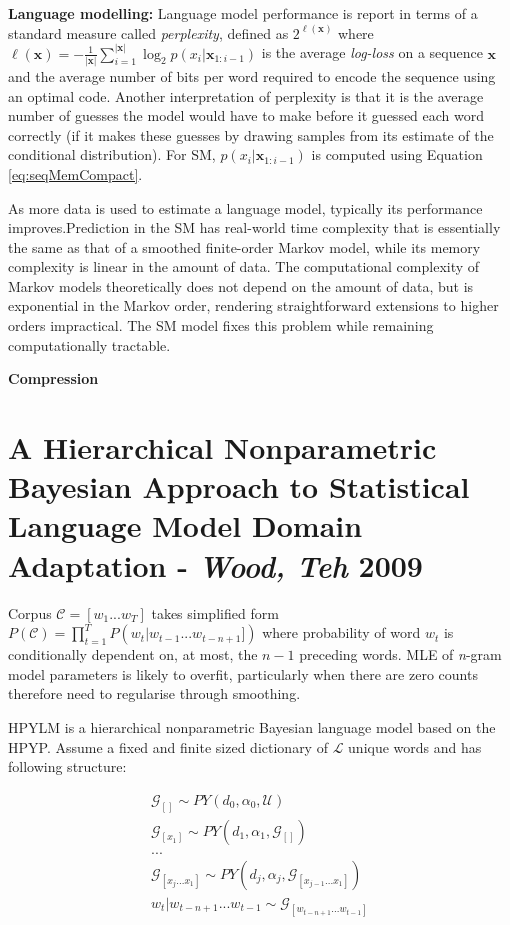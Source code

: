 \textbf{Language modelling:} Language model performance is report in terms of a standard measure called \textit{perplexity}, defined as $2^{\ell(\boldsymbol x)}$ where $\ell(\boldsymbol x)=-\frac{1}{|\boldsymbol x|}\sum_{i=1}^{|\boldsymbol x|}\log_{2}p(x_{i}|\boldsymbol x_{1:i-1})$ is the average \textit{log-loss} on a sequence $\boldsymbol x$ and the average number of bits per word required to encode the sequence using an optimal code. Another interpretation of perplexity is that it is the average number of guesses the model would have to make before it guessed each word correctly (if it makes these guesses by drawing samples from its estimate of the conditional distribution). For SM, $p(x_{i}|\boldsymbol x_{1:i-1})$ is computed using Equation \ref{eq:seqMemCompact}.

As more data is used to estimate a language model, typically its performance improves.Prediction in the SM has real-world time complexity that is essentially the same as that of a smoothed finite-order Markov model, while its memory complexity is linear in the amount of data. The computational complexity of Markov models theoretically does not depend on the amount of data, but is exponential in the Markov order, rendering straightforward extensions to higher orders impractical. The SM model fixes this problem while remaining computationally tractable.

\textbf{Compression}



\section{A Hierarchical Nonparametric Bayesian Approach to Statistical Language Model Domain Adaptation - \textit{Wood, Teh} 2009} \cite{wood2009hierarchical}

Corpus $\mathcal{C} =[w_{1}...w_{T}]$ takes simplified form $P(\mathcal{C})=\prod_{t=1}^{T}P(w_{t}|w_{t-1}...w_{t-n+1}])$ where probability of word $w_{t}$ is conditionally dependent on, at most, the $n-1$ preceding words. MLE of \textit{n}-gram model parameters is likely to overfit, particularly when there are zero counts therefore need to regularise through smoothing.

HPYLM is a hierarchical nonparametric Bayesian language model based on the HPYP. Assume a fixed and finite sized dictionary of $\mathcal{L}$ unique words and has following structure:

\begin{equation}
\begin{split}
\mathcal{G}_{[]}\sim PY(d_{0}, \alpha_{0}, \mathcal{U})
\\ 
\mathcal{G}_{[x_{1}]}\sim PY(d_{1}, \alpha_{1}, \mathcal{G}_{[]})
\\
...
 \\
\mathcal{G}_{[x_{j}...x_{1}]}\sim PY(d_{j}, \alpha_{j}, \mathcal{G}_{[x_{j-1}...x_{1}]})
 \\
w_{t}|w_{t-n+1}...w_{t-1}\sim \mathcal{G}_{[w_{t-n+1}...w_{t-1}]}
\end{split}
\end{equation}


